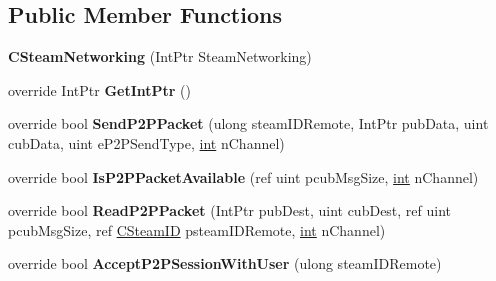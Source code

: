 \subsection*{Public Member Functions}
\begin{DoxyCompactItemize}
\item 
\hypertarget{classValve_1_1Steamworks_1_1CSteamNetworking_afe12a1be46f448ac0b992137b7cc567f}{}{\bfseries C\+Steam\+Networking} (Int\+Ptr Steam\+Networking)\label{classValve_1_1Steamworks_1_1CSteamNetworking_afe12a1be46f448ac0b992137b7cc567f}

\item 
\hypertarget{classValve_1_1Steamworks_1_1CSteamNetworking_ad01daf5a0dd9a38f8631b4e09c8532ec}{}override Int\+Ptr {\bfseries Get\+Int\+Ptr} ()\label{classValve_1_1Steamworks_1_1CSteamNetworking_ad01daf5a0dd9a38f8631b4e09c8532ec}

\item 
\hypertarget{classValve_1_1Steamworks_1_1CSteamNetworking_af49b33185613f7442d5fff06848307a7}{}override bool {\bfseries Send\+P2\+P\+Packet} (ulong steam\+I\+D\+Remote, Int\+Ptr pub\+Data, uint cub\+Data, uint e\+P2\+P\+Send\+Type, \hyperlink{SDL__thread_8h_a6a64f9be4433e4de6e2f2f548cf3c08e}{int} n\+Channel)\label{classValve_1_1Steamworks_1_1CSteamNetworking_af49b33185613f7442d5fff06848307a7}

\item 
\hypertarget{classValve_1_1Steamworks_1_1CSteamNetworking_aca076bc17683ecb0a1ddbc34933147e9}{}override bool {\bfseries Is\+P2\+P\+Packet\+Available} (ref uint pcub\+Msg\+Size, \hyperlink{SDL__thread_8h_a6a64f9be4433e4de6e2f2f548cf3c08e}{int} n\+Channel)\label{classValve_1_1Steamworks_1_1CSteamNetworking_aca076bc17683ecb0a1ddbc34933147e9}

\item 
\hypertarget{classValve_1_1Steamworks_1_1CSteamNetworking_aabd8158ca998000e2aa0afffb0cb7c88}{}override bool {\bfseries Read\+P2\+P\+Packet} (Int\+Ptr pub\+Dest, uint cub\+Dest, ref uint pcub\+Msg\+Size, ref \hyperlink{structValve_1_1Steamworks_1_1CSteamID}{C\+Steam\+I\+D} psteam\+I\+D\+Remote, \hyperlink{SDL__thread_8h_a6a64f9be4433e4de6e2f2f548cf3c08e}{int} n\+Channel)\label{classValve_1_1Steamworks_1_1CSteamNetworking_aabd8158ca998000e2aa0afffb0cb7c88}

\item 
\hypertarget{classValve_1_1Steamworks_1_1CSteamNetworking_a22028f04639b10efb143623842574f00}{}override bool {\bfseries Accept\+P2\+P\+Session\+With\+User} (ulong steam\+I\+D\+Remote)\label{classValve_1_1Steamworks_1_1CSteamNetworking_a22028f04639b10efb143623842574f00}


\end{DoxyCompactItemize}
